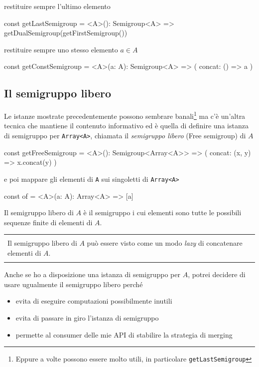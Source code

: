 \documentclass[12pt]{article}
\theoremstyle{definition}
\newenvironment{demo}
    {\begin{center}
    \begin{tabular}{|p{0.9\textwidth}|}
    \hline\\
    }
    {
    \\\\\hline
    \end{tabular}
    \end{center}
    }
\newenvironment{code}
  {\vspace{0.5cm} \VerbatimEnvironment\begin{typescriptcode}}
  {\end{typescriptcode} \vspace{0.2cm}}
\begin{document}
restituire sempre l'ultimo elemento

\begin{code}
const getLastSemigroup = <A>(): Semigroup<A> =>
  getDualSemigroup(getFirstSemigroup())
\end{code}

restituire sempre uno stesso elemento $a \in A$

\begin{code}
const getConstSemigroup = <A>(a: A): Semigroup<A> => ({
  concat: () => a
})
\end{code}

\subsection{Il semigruppo libero}

Le istanze mostrate precedentemente possono sembrare banali\footnote{Eppure a volte possono essere molto utili, in particolare \texttt{getLastSemigroup}}
ma c'è un'altra tecnica che mantiene il contenuto informativo ed è quella di definire una istanza di semigruppo per \texttt{Array<A>},
chiamata il \emph{semigruppo libero} (Free semigroup) di $A$

\begin{code}
const getFreeSemigroup = <A>(): Semigroup<Array<A>> => ({
  concat: (x, y) => x.concat(y)
})
\end{code}

e poi mappare gli elementi di \texttt{A} sui singoletti di \texttt{Array<A>}

\begin{code}
const of = <A>(a: A): Array<A> => [a]
\end{code}

Il semigruppo libero di $A$ è il semigruppo i cui elementi sono tutte le possibili sequenze finite di elementi di $A$.

\begin{demo}
Il semigruppo libero di $A$ può essere visto come un modo \emph{lazy} di concatenare elementi di $A$.
\end{demo}

Anche se ho a disposizione una istanza di semigruppo per $A$, potrei decidere di usare ugualmente il semigruppo libero perché

\begin{itemize}
  \item evita di eseguire computazioni possibilmente inutili
  \item evita di passare in giro l'istanza di semigruppo
  \item permette al consumer delle mie API di stabilire la strategia di merging
\end{itemize}
\end{document}
